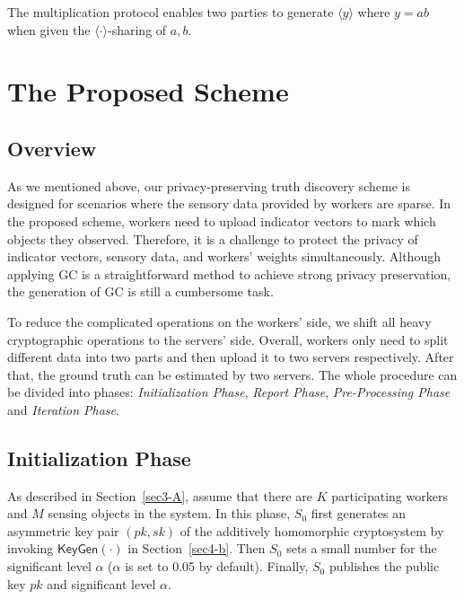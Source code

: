 \documentclass[conference]{IEEEtran}
\begin{document}
The multiplication protocol enables two parties to generate $\langle y \rangle$ where $y = ab$ when given the $\langle \cdot \rangle$-sharing of $a,b$.
\fi


\section{The Proposed Scheme}\label{sec5}
\subsection{Overview}
As we mentioned above, our privacy-preserving truth discovery scheme is designed for scenarios where the sensory data provided by workers are sparse.
In the proposed scheme, workers need to upload indicator vectors to mark which objects they observed.
Therefore, it is a challenge to protect the privacy of indicator vectors, sensory data, and workers' weights simultaneously.
Although applying GC is a straightforward method to achieve strong privacy preservation, the generation of GC is still a cumbersome task.

To reduce the complicated operations on the workers' side, we shift all heavy cryptographic operations to the servers' side.
Overall, workers only need to split different data into two parts and then upload it to two servers respectively.
After that, the ground truth can be estimated by two servers.
The whole procedure can be divided into  phases: {\em Initialization Phase}, {\em Report Phase}, {\em Pre-Processing Phase} and {\em Iteration Phase}.

\subsection{Initialization Phase}
As described in Section~\ref{sec3-A}, assume that there are $K$ participating workers and $M$ sensing objects in the system.
In this phase, $S_0$ first generates an asymmetric key pair $(pk, sk)$ of the additively homomorphic cryptosystem by invoking $\mathsf{KeyGen}(\cdot)$ in Section~\ref{sec4-b}.
Then $S_0$ sets a small number for the significant level $\alpha$ ($\alpha$ is set to 0.05 by default).
Finally, $S_0$ publishes the public key $pk$ and significant level $\alpha$.
\end{document}
